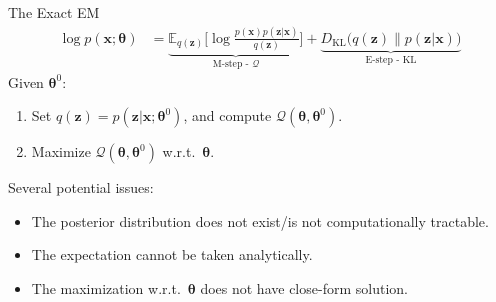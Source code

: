 \documentclass[aspectratio=169]{beamer}
\newcommand{\bs}[1]{\boldsymbol{#1}}
\begin{document}
\begin{frame}{The Exact EM}
 \begin{align*}
\log p(\bs{x};\bs{\theta}) &= \underbrace{\mathbb{E}_{q(\bs{z})}\Big[\log \frac{p(\bs{x})p(\bs{z}|\bs{x})}{q(\bs{z})}\Big]}_{\text{M-step - }\mathcal{Q}} +  \underbrace{D_{\text{KL}}\Big(q(\bs{z})\Big\lVert p(\bs{z}|\bs{x})\Big)}_{\text{E-step - KL}}
\end{align*}
Given $\bs{\theta}^0$:
\begin{enumerate}
 \item Set $q(\bs{z})=p(\bs{z}|\bs{x};\bs{\theta}^0)$, and compute $\mathcal{Q}(\bs{\theta},\bs{\theta}^0)$.
 \item Maximize $\mathcal{Q}(\bs{\theta},\bs{\theta}^0)$ w.r.t.\ $\bs{\theta}$.
\end{enumerate}\pause
Several potential issues:
\begin{itemize}
 \item The posterior distribution does not exist/is not computationally tractable.
 \item The expectation cannot be taken analytically.
 \item The maximization w.r.t.\ $\bs{\theta}$ does not have close-form solution.
\end{itemize}

\end{frame}


\end{document}
